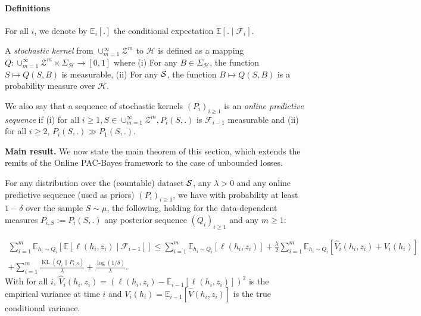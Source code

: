 \paragraph{Definitions} For all $i$, we denote by $\mathbb{E}_{i}[.]$ the conditional expectation $\mathbb{E}[.\mid \mathcal{F}_i]$.

A \emph{stochastic kernel} from $\cup_{m=1}^\infty\mathcal{Z}^m$ to $\mathcal{H}$ is defined as a mapping $Q: \cup_{m=1}^\infty\mathcal{Z}^m\times \Sigma_{\mathcal{H}} \rightarrow [0,1]$ where
(i) For any $B\in \Sigma_{\mathcal{H}}$, the function  $S\mapsto Q(S,B)$ is measurable,  (ii) For any $\S$, the function $B\mapsto Q(S,B)$ is a probability measure over $\mathcal{H}$.


We also say that a sequence of stochastic kernels $(P_i)_{i\geq 1}$ is an \emph{online predictive sequence} if (i) for all $i\geq 1, S\in\cup_{m=1}^\infty\mathcal{Z}^m, P_i(S,.)$ is $\mathcal{F}_{i-1}$ measurable and (ii) for all $i \geq 2$, $P_i(S,.)\gg P_{1}(S,.)$.

\textbf{Main result.} We now state the main theorem of this section, which extends the remits of the Online PAC-Bayes framework to the case of unbounded losses.

\begin{theorem}
  \label{th: main_thm_onl}
  For any distribution over the (countable) dataset $\S$, any $\lambda>0$ and any online predictive sequence (used as priors) $(P_i)_{i\geq 1}$, we have with probability at least $1-\delta$ over the sample $S\sim\mu$, the following, holding for the data-dependent measures $P_{i,S}:= P_i(S,.)$ any posterior sequence $(Q_i)_{i\geq 1}$ and any $m\geq 1$:

  \begin{multline*}
     \sum_{i=1}^m \mathbb{E}_{h_i\sim Q_{i}}\left[ \mathbb{E}[\ell(h_i,z_i) \mid \mathcal{F}_{i-1}]    \right]  \leq \sum_{i=1}^m \mathbb{E}_{h_i\sim Q_{i}}\left[ \ell(h_i,z_i) \right] +\frac{\lambda}{2}\sum_{i=1}^m \mathbb{E}_{h_i\sim Q_i}\left[ \hat{V}_i(h_i,z_i) + V_i(h_i) \right] \\
     + \sum_{i=1}^m\frac{\operatorname{KL}(Q_{i}\| P_{i,S})}{\lambda}  + \frac{\log(1/\delta)}{\lambda}.
  \end{multline*}
  With for all $i$, $\hat{V}_i(h_i,z_i)= (\ell(h_i,z_i)-\mathbb{E}_{i-1}[\ell(h_i,z_i)])^2$ is the empirical variance at time $i$ and $V_i(h_i)= \mathbb{E}_{i-1}[\hat{V}(h_i,z_i)]$ is the true conditional variance.
\end{theorem}

